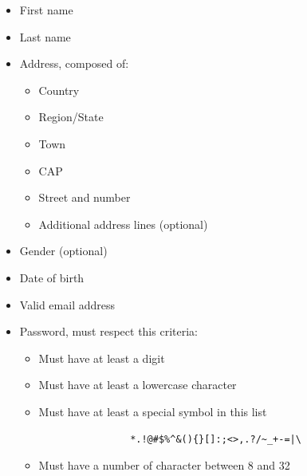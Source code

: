 \begin{itemize}
    \item First name
    \item Last name
    \item Address, composed of:
          \begin{itemize}
              \item Country
              \item Region/State
              \item Town
              \item CAP
              \item Street and number
              \item Additional address lines (optional)
          \end{itemize}
    \item Gender (optional)
    \item Date of birth
    \item Valid email address
    \item Password, must respect this criteria:\label{password_req}
          \begin{itemize}
              \item Must have at least a digit
              \item Must have at least a lowercase character
              \item Must have at least a special symbol in this list
                    \begin{verbatim}
                *.!@#$%^&(){}[]:;<>,.?/~_+-=|\
                    \end{verbatim}
              \item Must have a number of character between 8 and 32
          \end{itemize}
\end{itemize}